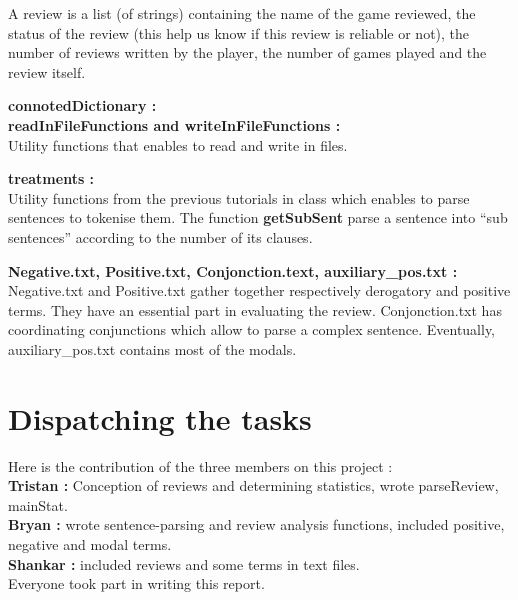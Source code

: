 \documentclass[paper=a4,fontsize=12pt]{report}
\begin{document}
A review is a list (of strings) containing  the name of the game reviewed, the status of the review (this help us know if this review is reliable or not), the number of reviews written by the player, the number of games played and the review itself. 

\textbf{connotedDictionary :} \\

\textbf{readInFileFunctions and writeInFileFunctions :} \\
Utility functions that enables to read and write in files. 

\textbf{treatments :} \\  
Utility functions from the previous tutorials in class which enables to parse sentences to tokenise them. The function \textbf{getSubSent} parse a sentence into "`sub sentences"' according to the number of its clauses.

\textbf{Negative.txt, Positive.txt, Conjonction.text, auxiliary\_pos.txt :} \\
Negative.txt and Positive.txt gather together respectively derogatory and positive terms. They have an essential part in evaluating the review. Conjonction.txt has coordinating conjunctions which allow to parse a complex sentence. Eventually, auxiliary\_pos.txt contains most of the modals. 

\section{Dispatching the tasks}
Here is the contribution of the three members on this project :
\\
\textbf{Tristan : } Conception of reviews and determining statistics, wrote parseReview, mainStat.
\\
\textbf{Bryan : } wrote sentence-parsing and review analysis functions, included positive, negative and modal terms.
\\
\textbf{Shankar : } included reviews and some terms in text files.
\\
Everyone took part in writing this report.
\end{document}
